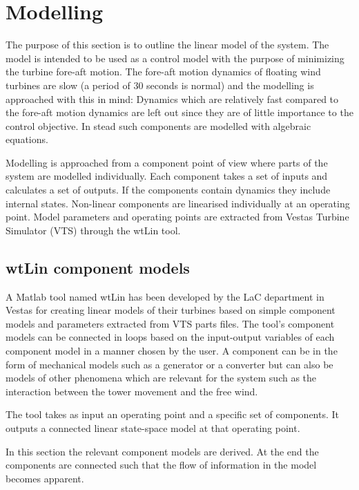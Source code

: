 \section{Modelling} \label{sec:mod} %
The purpose of this section is to outline the linear model of the system. The model is intended to be used as a control model with the purpose of minimizing the turbine fore-aft motion. The fore-aft motion dynamics of floating wind turbines are slow (a period of 30 seconds is normal) and the modelling is approached with this in mind: Dynamics which are relatively fast compared to the fore-aft motion dynamics are left out since they are of little importance to the control objective. In stead such components are modelled with algebraic equations. 

Modelling is approached from a component point of view where parts of the system are modelled individually. Each component takes a set of inputs and calculates a set of outputs. If the components contain dynamics they include internal states. Non-linear components are linearised individually at an operating point. Model parameters and operating points are extracted from Vestas Turbine Simulator (VTS) through the wtLin tool.


\subsection{wtLin component models} \label{sec:mod_wtLincomps}
A Matlab tool named wtLin has been developed by the LaC department in Vestas for creating linear models of their turbines based on simple component models and parameters extracted from VTS parts files. The tool's component models can be connected in loops based on the input-output variables of each component model in a manner chosen by the user. A component can be in the form of mechanical models such as a generator or a converter but can also be models of other phenomena which are relevant for the system such as the interaction between the tower movement and the free wind.

The tool takes as input an operating point and a specific set of components. It outputs a connected linear state-space model at that operating point.

In this section the relevant component models are derived. At the end the components are connected such that the flow of information in the model becomes apparent. 


